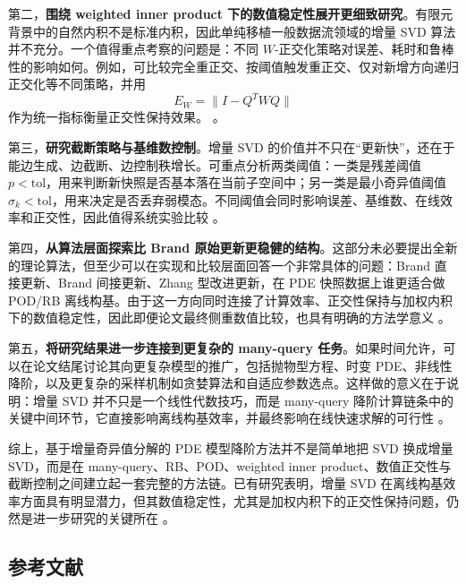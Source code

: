 第二，\textbf{围绕 weighted inner product 下的数值稳定性展开更细致研究}。有限元背景中的自然内积不是标准内积，因此单纯移植一般数据流领域的增量 SVD 算法并不充分。一个值得重点考察的问题是：不同 $W$-正交化策略对误差、耗时和鲁棒性的影响如何。例如，可比较完全重正交、按阈值触发重正交、仅对新增方向递归正交化等不同策略，并用
\[
E_W=\|I-Q^TWQ\|
\]
作为统一指标衡量正交性保持效果。 \cite{fareed2020,zhang2022}。

第三，\textbf{研究截断策略与基维数控制}。增量 SVD 的价值并不只在“更新快”，还在于能边生成、边截断、边控制秩增长。可重点分析两类阈值：一类是残差阈值 $p<\mathrm{tol}$，用来判断新快照是否基本落在当前子空间中；另一类是最小奇异值阈值 $\sigma_k<\mathrm{tol}$，用来决定是否丢弃弱模态。不同阈值会同时影响误差、基维数、在线效率和正交性，因此值得系统实验比较 \cite{brand2002,fareed2018,zhang2022}。

第四，\textbf{从算法层面探索比 Brand 原始更新更稳健的结构}。这部分未必要提出全新的理论算法，但至少可以在实现和比较层面回答一个非常具体的问题：Brand 直接更新、Brand 间接更新、Zhang 型改进更新，在 PDE 快照数据上谁更适合做 POD/RB 离线构基。由于这一方向同时连接了计算效率、正交性保持与加权内积下的数值稳定性，因此即便论文最终侧重数值比较，也具有明确的方法学意义 \cite{brand2006,zhang2022}。

第五，\textbf{将研究结果进一步连接到更复杂的 many-query 任务}。如果时间允许，可以在论文结尾讨论其向更复杂模型的推广，包括抛物型方程、时变 PDE、非线性降阶，以及更复杂的采样机制如贪婪算法和自适应参数选点。这样做的意义在于说明：增量 SVD 并不只是一个线性代数技巧，而是 many-query 降阶计算链条中的关键中间环节，它直接影响离线构基效率，并最终影响在线快速求解的可行性 \cite{hesthaven2015,patera_rozza,zhang2022}。

综上，基于增量奇异值分解的 PDE 模型降阶方法并不是简单地把 SVD 换成增量 SVD，而是在 many-query、RB、POD、weighted inner product、数值正交性与截断控制之间建立起一套完整的方法链。已有研究表明，增量 SVD 在离线构基效率方面具有明显潜力，但其数值稳定性，尤其是加权内积下的正交性保持问题，仍然是进一步研究的关键所在 \cite{brand2002,brand2006,fareed2018,zhang2022}。


{
\newpage

\subsection{参考文献}
{\normalfont{}\setlength{\baselineskip}{14pt}
\renewcommand{\refname}{\vspace{-\baselineskip}}
}
}